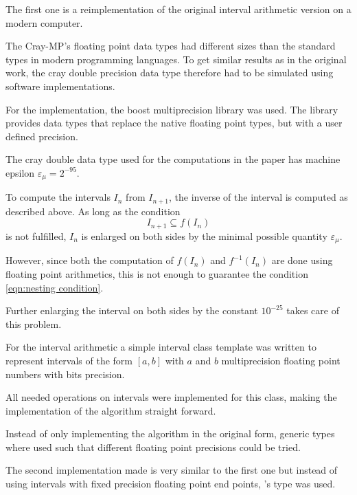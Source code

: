   The first one is a reimplementation of the original interval arithmetic version
  on a modern computer.
  
  The Cray-MP's floating point data types had different sizes than the
  standard types in modern programming languages.
  To get similar results as in the original work,  the cray double precision
  data type therefore had to be simulated using software implementations.
  
  For the \cc implementation, the boost multiprecision library \cite{boostmultiprecision} was used. 
  The library provides data types that replace the native \cc floating point types, but with a user defined precision. 
 
  The cray double data type used for the computations in the paper has machine epsilon
  $\varepsilon_\mu = 2^{-95}$.

  To compute the intervals $I_n$ from $I_{n+1}$, the inverse of the interval is
  computed as described above. 
  As long as the condition 
  \begin{equation}\label{eqn:nesting condition}  
    I_{n+1} \subseteq f(I_n) 
  \end{equation}
  is not fulfilled, $I_n$ is enlarged on both sides by the minimal possible quantity $\varepsilon_\mu$. 

  However, since both the computation of $f(I_n)$ and $f^{-1}(I_n)$ are done using
  floating point arithmetics, this is not enough to guarantee the condition
  \ref{eqn:nesting condition}.
  
  Further enlarging the interval on both sides by the constant $10^{-25}$
  takes care of this problem.
  
  For the interval arithmetic a simple interval class template
   was written to represent
  intervals of the form $[a,b]$ with $a$ and $b$ multiprecision floating point
  numbers with  bits precision. 

  All needed operations on intervals were implemented for this class, making
  the implementation of the algorithm straight forward.

  Instead of only implementing the algorithm in the original form, generic
  types where used such that different floating point precisions could be
  tried.

  The second implementation made is very similar to the first one but instead
  of using intervals with fixed precision floating point end points, \irram's
   type was used.

